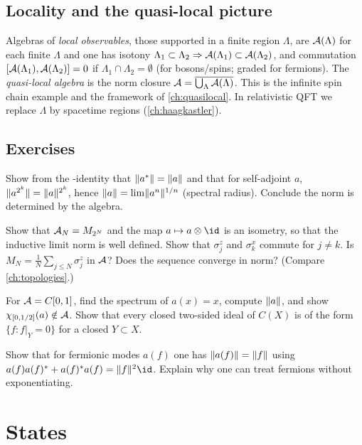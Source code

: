 \subsection{Locality and the quasi-local picture}

Algebras of \emph{local observables}, those supported in a finite region $\Lambda$, are $\mathcal{A}(\Lambda)$ for each finite $\Lambda$ and one has isotony $\Lambda_1\subset\Lambda_2\Rightarrow\mathcal{A}(\Lambda_1)\subset\mathcal{A}(\Lambda_2)$, and commutation $[\mathcal{A}(\Lambda_1),\mathcal{A}(\Lambda_2)]=0$ if $\Lambda_1\cap\Lambda_2=\emptyset$ (for bosons/spins; graded for fermions). The \emph{quasi-local algebra} is the norm closure $\mathcal{A}=\overline{\bigcup_\Lambda\mathcal{A}(\Lambda)}$. This is the infinite spin chain example and the framework of \cref{ch:quasilocal}. In relativistic QFT we replace $\Lambda$ by spacetime regions (\cref{ch:haagkastler}).

\subsection*{Exercises}
\begin{exercise}\label{ex:cstar:1}
Show from the \cstar-identity that $\lVert a^{*}\rVert=\lVert a\rVert$ and that for self-adjoint $a$, $\lVert a^{2^k}\rVert=\lVert a\rVert^{2^k}$, hence $\lVert a\rVert=\lim\lVert a^n\rVert^{1/n}$ (spectral radius). Conclude the norm is determined by the algebra.
\end{exercise}
\begin{exercise}\label{ex:cstar:2}
Show that $\mathcal{A}_N=M_{2^N}$ and the map $a\mapsto a\otimes\id$ is an isometry, so that the inductive limit norm is well defined. Show that $\sigma^z_j$ and $\sigma^x_k$ commute for $j\ne k$. Is $M_N=\frac1N\sum_{j\le N}\sigma_j^z$ in $\mathcal{A}$? Does the sequence converge in norm? (Compare \cref{ch:topologies}.)
\end{exercise}
\begin{exercise}\label{ex:cstar:3}
For $\mathcal{A}=C[0,1]$, find the spectrum of $a(x)=x$, compute $\lVert a\rVert$, and show $\chi_{[0,1/2]}(a)\notin\mathcal{A}$. Show that every closed two-sided ideal of $C(X)$ is of the form $\{f:f|_Y=0\}$ for a closed $Y\subset X$.
\end{exercise}
\begin{exercise}\label{ex:cstar:4}
Show that for fermionic modes $a(f)$ one has $\lVert a(f)\rVert=\lVert f\rVert$ using $a(f)a(f)\ad+a(f)\ad a(f)=\norm f^2\id$. Explain why one can treat fermions without exponentiating.
\end{exercise}

\section{States}\label{ch:states}

